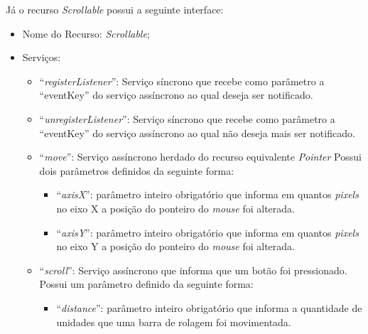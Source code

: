 Já o recurso \emph{Scrollable} possui a seguinte interface:

\begin{itemize}
	
	\item Nome do Recurso: \emph{Scrollable};

	\item Serviços:
		
		\begin{itemize}
			
			\item ``\emph{registerListener}'': Serviço síncrono que recebe como parâmetro a ``eventKey'' do serviço assíncrono ao qual deseja ser notificado.

			\item ``\emph{unregisterListener}'': Serviço síncrono que recebe como parâmetro a ``eventKey'' do serviço assíncrono ao qual não deseja mais ser notificado.

			\item ``\emph{move}'': Serviço assíncrono herdado do recurso equivalente \emph{Pointer} Possui dois parâmetros definidos da seguinte forma:

				\begin{itemize}
					\item ``\emph{axisX}'': parâmetro inteiro obrigatório que informa em quantos \emph{pixels} no eixo X a posição do ponteiro do \emph{mouse} foi alterada.

					\item ``\emph{axisY}'': parâmetro inteiro obrigatório que informa em quantos \emph{pixels} no eixo Y a posição do ponteiro do \emph{mouse} foi alterada.
				\end{itemize}
			
			\item ``\emph{scroll}'': Serviço assíncrono que informa que um botão foi pressionado. Possui um parâmetro definido da seguinte forma:

				\begin{itemize}
					\item ``\emph{distance}'': parâmetro inteiro obrigatório que informa a quantidade de unidades que uma barra de rolagem foi movimentada.
				\end{itemize}

		\end{itemize}
\end{itemize}

